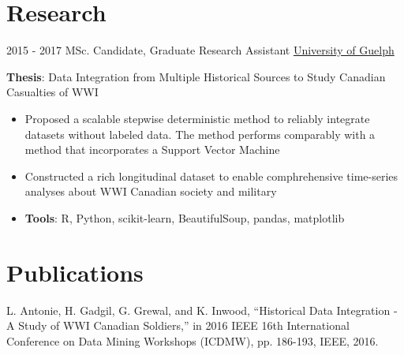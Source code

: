 \documentclass[letterpaper]{tenseconds} %
\begin{document}
\section{Research}
\begin{twenty}
    \twentyitem
        {2015 - 2017}
        {}
        {MSc. Candidate, Graduate Research Assistant}
        {\href{http://www.uoguelph.ca/}{University of Guelph}}
        {}
        {
        \textbf{Thesis}: Data Integration from Multiple Historical Sources to Study Canadian Casualties of WWI
        {\begin{itemize}
        \item Proposed a scalable stepwise deterministic method to reliably integrate datasets without labeled data. The method performs comparably with a method that incorporates a Support Vector Machine
        \item Constructed a rich longitudinal dataset to enable comphrehensive time-series analyses about WWI Canadian society and military
        \item \textbf{Tools}: R, Python, scikit-learn, BeautifulSoup, pandas, matplotlib \vspace{2mm}
        \end{itemize}}
        }
\end{twenty}

\section{Publications}
L. Antonie, H. Gadgil, G. Grewal, and K. Inwood, “Historical Data Integration - A Study of WWI Canadian Soldiers,” in 2016 IEEE 16th International Conference on Data Mining Workshops (ICDMW), pp. 186-193, IEEE, 2016. \vspace{2mm}
\end{document}

